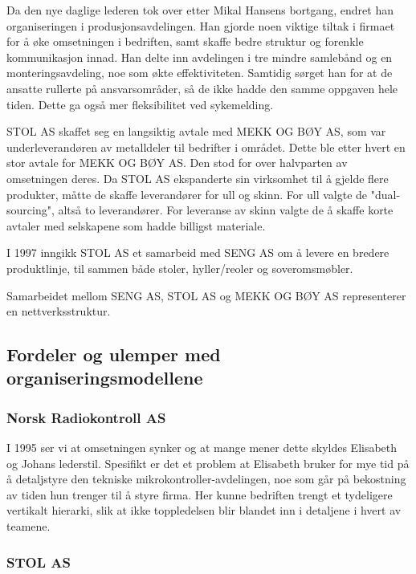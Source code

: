 Da den nye daglige lederen tok over etter Mikal Hansens bortgang, endret han organiseringen i produsjonsavdelingen.
Han gjorde noen viktige tiltak i firmaet for å øke omsetningen i bedriften, samt skaffe bedre struktur og forenkle kommunikasjon innad.
Han delte inn avdelingen i tre mindre samlebånd og en monteringsavdeling, noe som økte effektiviteten. Samtidig sørget han for at de ansatte rullerte på ansvarsområder, så de ikke hadde den samme oppgaven hele tiden. Dette ga også mer fleksibilitet ved sykemelding.

STOL AS skaffet seg en langsiktig avtale med MEKK OG BØY AS, som var underleverandøren av metalldeler til bedrifter i området. Dette ble etter hvert en stor avtale for MEKK OG BØY AS. Den stod for over halvparten av omsetningen deres. Da STOL AS ekspanderte sin virksomhet til å gjelde flere produkter, måtte de skaffe leverandører for ull og skinn. For ull valgte de "dual-sourcing", altså to leverandører. For leveranse av skinn valgte de å skaffe korte avtaler med selskapene som hadde billigst materiale.

I 1997 inngikk STOL AS et samarbeid med SENG AS om å levere en bredere produktlinje, til sammen både stoler, hyller/reoler og soveromsmøbler.

Samarbeidet mellom SENG AS, STOL AS og MEKK OG BØY AS representerer en nettverksstruktur.

\subsection{Fordeler og ulemper med organiseringsmodellene}

\subsubsection{Norsk Radiokontroll AS}

I 1995 ser vi at omsetningen synker og at mange mener dette skyldes Elisabeth og Johans lederstil. Spesifikt er det et problem at Elisabeth bruker for mye tid på å detaljstyre den tekniske mikrokontroller-avdelingen, noe som går på bekostning av tiden hun trenger til å styre firma.
Her kunne bedriften trengt et tydeligere vertikalt hierarki, slik at ikke toppledelsen blir blandet inn i detaljene i hvert av teamene.

\subsubsection{STOL AS}

